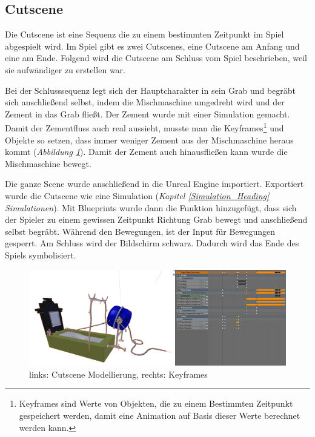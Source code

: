 \subsection{Cutscene}

Die Cutscene ist eine Sequenz die zu einem bestimmten Zeitpunkt im Spiel abgespielt wird.
Im Spiel gibt es zwei Cutscenes, eine Cutscene am Anfang und eine am Ende. Folgend wird die Cutscene
am Schluss vom Spiel beschrieben, weil sie aufwändiger zu erstellen war.

Bei der Schlusssequenz legt sich der Hauptcharakter in sein Grab und begräbt sich anschließend selbst, indem
die Mischmaschine umgedreht wird und der Zement in das Grab fließt. Der Zement wurde mit einer Simulation gemacht.
Damit der Zementfluss auch real aussieht, musste man die Keyframes\footnote{Keyframes sind Werte von Objekten, die zu einem Bestimmten Zeitpunkt gespeichert werden, damit eine Animation auf Basis dieser Werte berechnet werden kann.}
und Objekte so setzen, dass immer weniger Zement aus der Mischmaschine heraus kommt (\textit{Abbildung \ref{cutscene:image_modellierung}}). Damit der Zement auch hinausfließen kann wurde die Mischmaschine bewegt.

Die ganze Scene wurde anschließend in die Unreal Engine importiert. Exportiert wurde die Cutscene wie eine Simulation (\textit{Kapitel \ref{Simulation_Heading} \dq Simulationen\dq}).
Mit Blueprints wurde dann die Funktion hinzugefügt, dass sich der
Spieler zu einem gewissen Zeitpunkt Richtung Grab bewegt und anschließend selbst begräbt. Während den Bewegungen, ist der Input für Bewegungen gesperrt.
Am Schluss wird der Bildschirm schwarz. Dadurch wird das Ende des Spiels symbolisiert.

\begin{figure}[h]
    \centering
    \includegraphics[width=.8\textwidth]{images/Cutscene_Modellierung.png}
    \caption{links: Cutscene Modellierung, rechts: Keyframes}
    \label{cutscene:image_modellierung}
\end{figure}